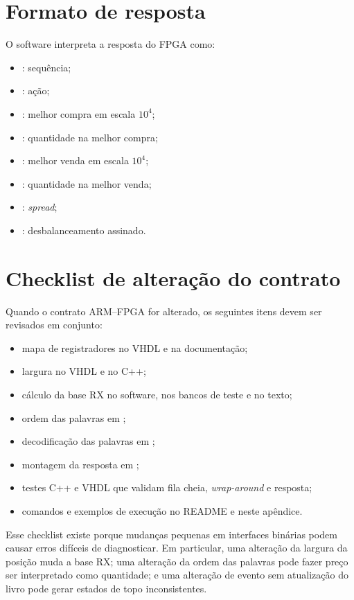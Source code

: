 \section{Formato de resposta}\label{sec:apendiceResposta}

O software interpreta a resposta do FPGA como:

\begin{itemize}
  \item {}: sequência;
  \item {}: ação;
  \item {}: melhor compra em escala $10^4$;
  \item {}: quantidade na melhor compra;
  \item {}: melhor venda em escala $10^4$;
  \item {}: quantidade na melhor venda;
  \item {}: \textit{spread};
  \item {}: desbalanceamento assinado.
\end{itemize}

\section{Checklist de alteração do contrato}\label{sec:apendiceChecklistContrato}

Quando o contrato ARM--FPGA for alterado, os seguintes itens devem ser revisados em conjunto:

\begin{itemize}
  \item mapa de registradores no VHDL e na documentação;
  \item largura  no VHDL e  no C++;
  \item cálculo da base RX no software, nos bancos de teste e no texto;
  \item ordem das palavras em ;
  \item decodificação das palavras em ;
  \item montagem da resposta em ;
  \item testes C++ e VHDL que validam fila cheia, \textit{wrap-around} e resposta;
  \item comandos e exemplos de execução no README e neste apêndice.
\end{itemize}

Esse checklist existe porque mudanças pequenas em interfaces binárias podem causar erros difíceis de diagnosticar. Em particular, uma alteração da largura da posição muda a base RX; uma alteração da ordem das palavras pode fazer preço ser interpretado como quantidade; e uma alteração de evento sem atualização do livro pode gerar estados de topo inconsistentes.
